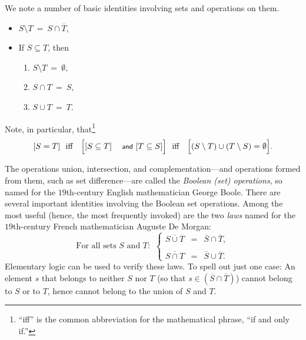 \bigskip

\noindent
We note a number of basic identities involving sets and operations on them.
\begin{itemize}
\item
$S \setminus T \ = \ S \cap \overline{T}$,
\medskip\item
If $S \subseteq T$, then
  \begin{enumerate}
  \item
$S \setminus T \ = \ \emptyset$,
  \medskip\item
$S \cap T \ = \ S$,
  \medskip\item
$S \cup T \ = \ T$.
  \end{enumerate}
\end{itemize}
Note, in particular, that\footnote{``iff'' is the common abbreviation for the mathematical phrase, ``if and only if.''}
\[ [S = T] \ \mbox{  iff  } \ \ \Bigl[[S \subseteq T] \mbox{
    {\small\sf and} } [T \subseteq S]\Bigr] \ \mbox{  iff  }
\ \ \Bigl[ (S \setminus T) \cup (T \setminus S) = \emptyset\Bigr].
\]

\medskip

 
 
 
The operations union, intersection, and complementation---and operations formed from them, such as set difference---are called the {\em Boolean (set) operations}, so named for the
$19$th-century English mathematician George Boole.  There are several important identities involving the Boolean set operations.  Among the most useful (hence, the most frequently invoked) are the two {\em laws} named for the $19$th-century French mathematician Auguste De Morgan:
\begin{equation}
\label{e.de-morgan}
\mbox{For all sets $S$ and $T$: } \ \left\{
\begin{array}{lcl}
\overline{S \cup T} & = & \overline{S} \cap \overline{T}, \\
 \\
\overline{S \cap T} & = & \overline{S} \cup \overline{T}.
\end{array}
\right.
\end{equation}
Elementary logic can be used to verify these laws.  To spell out just one case: An element $s$ that belongs to neither $S$ nor $T$ (so that $s \in \left(\overline{S} \cap \overline{T}\right)$) cannot belong to $S$ or to $T$, hence cannot belong to the union of $S$ and $T$.

